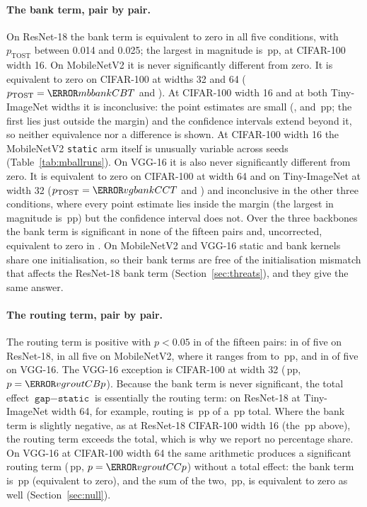 \documentclass[10pt,a4paper]{article}
\begin{document}
\paragraph{The bank term, pair by pair.} On ResNet-18 the bank term is equivalent to
zero in all five conditions, with $p_{\text{TOST}}$ between 0.014 and
0.025; the largest in magnitude is \,pp, at CIFAR-100 width 16.
On MobileNetV2 it is never significantly different from zero. It is
equivalent to zero on CIFAR-100 at widths 32 and 64
($p_{\text{TOST}}=\V{mbbankCBT}$ and ). At CIFAR-100 width 16
and at both Tiny-ImageNet widths it is inconclusive: the point estimates
are small (,  and \,pp; the first lies
just outside the margin) and the confidence intervals extend beyond it, so
neither equivalence nor a difference is shown. At CIFAR-100 width 16 the
MobileNetV2 \texttt{static} arm itself is unusually variable across seeds
(Table~\ref{tab:mballruns}). On VGG-16 it is also never significantly
different from zero. It is equivalent to zero on CIFAR-100 at width 64 and
on Tiny-ImageNet at width 32 ($p_{\text{TOST}}=\V{vgbankCCT}$ and
) and inconclusive in the other three conditions, where every
point estimate lies inside the margin (the largest in magnitude is
\,pp) but the confidence interval does not. Over the three
backbones the bank term is significant in none of the fifteen pairs and,
uncorrected, equivalent to zero in . On MobileNetV2 and VGG-16 static and
bank kernels share one initialisation, so their bank terms are free of
the initialisation mismatch that affects the ResNet-18 bank term
(Section~\ref{sec:threats}), and they give the same answer.

\paragraph{The routing term, pair by pair.} The routing term is positive with $p<0.05$
in  of the fifteen pairs: in  of five on ResNet-18,
in all five on MobileNetV2, where it ranges from  to
\,pp, and in  of five on VGG-16. The VGG-16
exception is CIFAR-100 at width 32 (\,pp, $p=\V{vgroutCBp}$).
Because the bank term is never significant, the total effect
$\texttt{gap}-\texttt{static}$ is essentially the routing term: on
ResNet-18 at Tiny-ImageNet width 64, for example, routing is
\,pp of a \,pp total. Where the bank term is slightly
negative, as at ResNet-18 CIFAR-100 width 16 (the \,pp above),
the routing term exceeds the total, which is why we report no percentage
share. On VGG-16 at CIFAR-100 width 64 the same arithmetic produces a
significant routing term (\,pp, $p=\V{vgroutCCp}$) without a
total effect: the bank term is \,pp (equivalent to zero), and
the sum of the two, \,pp, is equivalent to zero as well
(Section~\ref{sec:null}).
\end{document}
